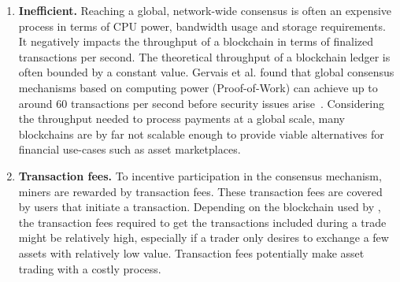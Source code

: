 \begin{enumerate}
	\item \textbf{Inefficient.} Reaching a global, network-wide consensus is often an expensive process in terms of CPU power, bandwidth usage and storage requirements.
	It negatively impacts the throughput of a blockchain in terms of finalized transactions per second.
	The theoretical throughput of a blockchain ledger is often bounded by a constant value.
	Gervais et al. found that global consensus mechanisms based on computing power (Proof-of-Work) can achieve up to around 60 transactions per second before security issues arise~\cite{gervais2016security}.
	Considering the throughput needed to process payments at a global scale, many blockchains are by far not scalable enough to provide viable alternatives for financial use-cases such as asset marketplaces.
	\item \textbf{Transaction fees.} To incentive participation in the consensus mechanism, miners are rewarded by transaction fees.
	These transaction fees are covered by users that initiate a transaction.
	Depending on the blockchain used by \ModelName{}, the transaction fees required to get the transactions included during a trade might be relatively high, especially if a trader only desires to exchange a few assets with relatively low value.
	Transaction fees potentially make asset trading with \ModelName{} a costly process.
\end{enumerate}



